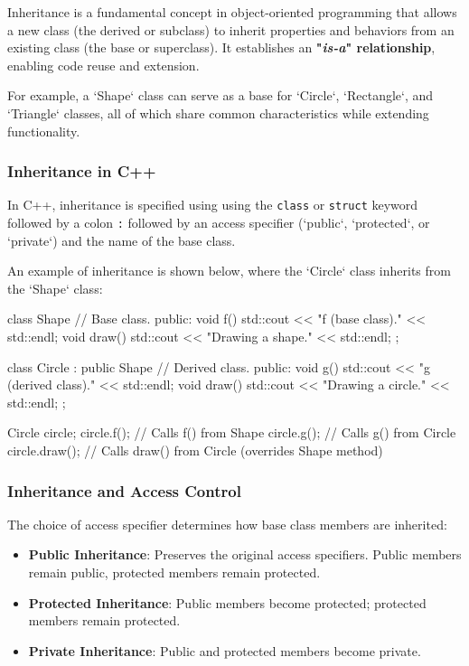 Inheritance is a fundamental concept in object-oriented programming that allows a new class (the derived or subclass) to inherit properties and behaviors from an existing class (the base or superclass). It establishes an \textbf{"\textit{is-a}" relationship}, enabling code reuse and extension.

For example, a `Shape` class can serve as a base for `Circle`, `Rectangle`, and `Triangle` classes, all of which share common characteristics while extending functionality.

\subsubsection{Inheritance in C++}

In C++, inheritance is specified using using the \texttt{class} or \texttt{struct} keyword followed by a colon \texttt{:} followed by an access specifier (`public`, `protected`, or `private`) and the name of the base class.

\begin{exampleblock}[Inheritance]

    An example of inheritance is shown below, where the `Circle` class inherits from the `Shape` class:

\begin{codeblock}[language=C++]
class Shape { // Base class.
public:
    void f() { std::cout << "f (base class)." << std::endl; }
    void draw() { std::cout << "Drawing a shape." << std::endl; }
};

class Circle : public Shape { // Derived class.
public:
    void g() { std::cout << "g (derived class)." << std::endl; }
    void draw() { std::cout << "Drawing a circle." << std::endl; }
};

Circle circle;
circle.f();    // Calls f() from Shape
circle.g();    // Calls g() from Circle
circle.draw(); // Calls draw() from Circle (overrides Shape method)
\end{codeblock}
\end{exampleblock}

\subsubsection{Inheritance and Access Control}

The choice of access specifier determines how base class members are inherited:

\begin{itemize}
    \item \textbf{Public Inheritance}: Preserves the original access specifiers. Public members remain public, protected members remain protected.
    \item \textbf{Protected Inheritance}: Public members become protected; protected members remain protected.
    \item \textbf{Private Inheritance}: Public and protected members become private.
\end{itemize}

